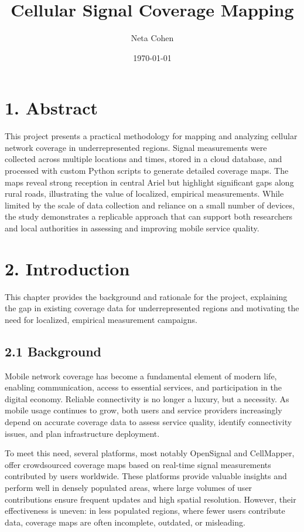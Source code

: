\documentclass[11pt]{article}
\title{\LARGE \textbf{Cellular Signal Coverage Mapping}}
\author{\large Neta Cohen}
\date{\today}
\begin{document}
\maketitle

\hypertarget{abstract}{%
\section{1. Abstract}\label{abstract}}

This project presents a practical methodology for mapping and analyzing
cellular network coverage in underrepresented regions. Signal
measurements were collected across multiple locations and times, stored
in a cloud database, and processed with custom Python scripts to
generate detailed coverage maps. The maps reveal strong reception in
central Ariel but highlight significant gaps along rural roads,
illustrating the value of localized, empirical measurements. While
limited by the scale of data collection and reliance on a small number
of devices, the study demonstrates a replicable approach that can
support both researchers and local authorities in assessing and
improving mobile service quality.

{\small
\tableofcontents
}\newpage

\hypertarget{introduction}{%
\section{ 2. Introduction}\label{introduction}}

This chapter provides the background and rationale for the project,
explaining the gap in existing coverage data for underrepresented
regions and motivating the need for localized, empirical measurement
campaigns.

\hypertarget{background}{%
\subsection{2.1 Background}\label{background}}

Mobile network coverage has become a fundamental element of modern life,
enabling communication, access to essential services, and participation
in the digital economy. Reliable connectivity is no longer a luxury, but
a necessity. As mobile usage continues to grow, both users and service
providers increasingly depend on accurate coverage data to assess
service quality, identify connectivity issues, and plan infrastructure
deployment.

To meet this need, several platforms, most notably OpenSignal\cite{opensignal2024} and
CellMapper\cite{cellmapper2024}, offer crowdsourced coverage maps based on real-time signal
measurements contributed by users worldwide. These platforms provide
valuable insights and perform well in densely populated areas, where
large volumes of user contributions ensure frequent updates and high
spatial resolution. However, their effectiveness is uneven: in less
populated regions, where fewer users contribute data, coverage maps are
often incomplete, outdated, or misleading.
\end{document}
